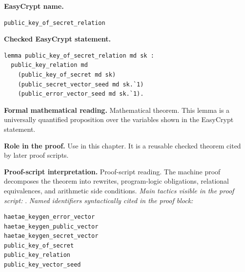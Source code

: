 \begin{formaltheorem}
\noindent\textbf{EasyCrypt name.}
\begin{lstlisting}[language=EasyCrypt,basicstyle=\ttfamily\scriptsize]
public_key_of_secret_relation
\end{lstlisting}
\noindent\textbf{Checked EasyCrypt statement.}
\begin{lstlisting}[language=EasyCrypt,basicstyle=\ttfamily\scriptsize]
lemma public_key_of_secret_relation md sk :
  public_key_relation md
    (public_key_of_secret md sk)
    (public_secret_vector_seed md sk.`1)
    (public_error_vector_seed md sk.`1).
\end{lstlisting}
\noindent\textbf{Formal mathematical reading.}
Mathematical theorem. This lemma is a universally quantified proposition over the variables shown in the EasyCrypt statement.

\noindent\textbf{Role in the proof.}
Use in this chapter. It is a reusable checked theorem cited by later proof scripts.

\noindent\textbf{Proof-script interpretation.}
Proof-script reading. The machine proof decomposes the theorem into rewrites, program-logic obligations, relational equivalences, and arithmetic side conditions.
\emph{Main tactics visible in the proof script:} .
\emph{Named identifiers syntactically cited in the proof block:}
\begin{lstlisting}[language=EasyCrypt,basicstyle=\ttfamily\scriptsize]
haetae_keygen_error_vector
haetae_keygen_public_vector
haetae_keygen_secret_vector
public_key_of_secret
public_key_relation
public_key_vector_seed
\end{lstlisting}

\end{formaltheorem}

